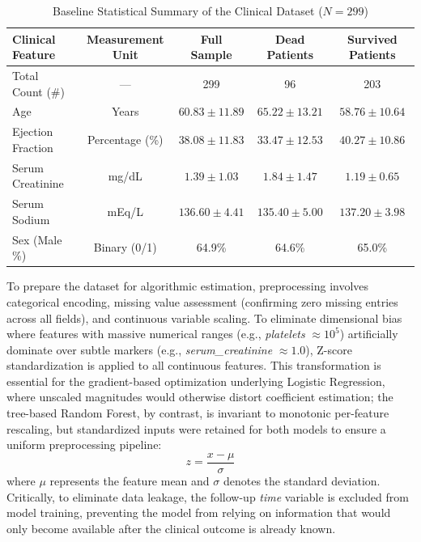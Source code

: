 \documentclass[11pt]{article} %
\begin{document}
\begin{table}[htbp]
\centering
\caption{Baseline Statistical Summary of the Clinical Dataset ($N=299$)}
\label{tab:baseline}
\vspace{0.2cm}
\begin{tabular}{lcccc}
\toprule
\textbf{Clinical Feature} & \textbf{Measurement Unit} & \textbf{Full Sample} & \textbf{Dead Patients} & \textbf{Survived Patients} \\
\midrule
Total Count (\#) & --- & 299 & 96 & 203 \\
Age & Years & $60.83 \pm 11.89$ & $65.22 \pm 13.21$ & $58.76 \pm 10.64$ \\
Ejection Fraction & Percentage (\%) & $38.08 \pm 11.83$ & $33.47 \pm 12.53$ & $40.27 \pm 10.86$ \\
Serum Creatinine & mg/dL & $1.39 \pm 1.03$ & $1.84 \pm 1.47$ & $1.19 \pm 0.65$ \\
Serum Sodium & mEq/L & $136.60 \pm 4.41$ & $135.40 \pm 5.00$ & $137.20 \pm 3.98$ \\
Sex (Male \%) & Binary (0/1) & 64.9\% & 64.6\% & 65.0\% \\
\bottomrule
\end{tabular}
\end{table}

To prepare the dataset for algorithmic estimation, preprocessing involves categorical encoding, missing value assessment (confirming zero missing entries across all fields), and continuous variable scaling. To eliminate dimensional bias where features with massive numerical ranges (e.g., \textit{platelets} $\approx 10^5$) artificially dominate over subtle markers (e.g., \textit{serum\_creatinine} $\approx 1.0$), Z-score standardization is applied to all continuous features. This transformation is essential for the gradient-based optimization underlying Logistic Regression, where unscaled magnitudes would otherwise distort coefficient estimation; the tree-based Random Forest, by contrast, is invariant to monotonic per-feature rescaling, but standardized inputs were retained for both models to ensure a uniform preprocessing pipeline:
\begin{equation}
z = \frac{x - \mu}{\sigma}
\end{equation}
where $\mu$ represents the feature mean and $\sigma$ denotes the standard deviation. Critically, to eliminate data leakage, the follow-up \textit{time} variable is excluded from model training, preventing the model from relying on information that would only become available after the clinical outcome is already known.
\end{document}
